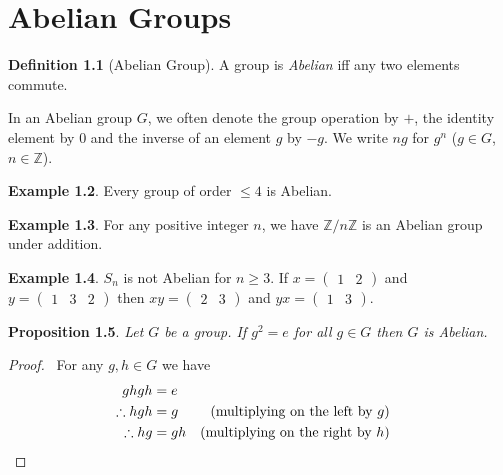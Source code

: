 \documentclass{book}
\let\qed\relax
\newtheorem{prop}{Proposition}[chapter]
\theoremstyle{definition}
\newtheorem{df}[prop]{Definition}
\newtheorem{ex}[prop]{Example}
\begin{document}
\chapter{Abelian Groups}

\begin{df}[Abelian Group]
    A group is \emph{Abelian} iff any two elements commute.
\end{df}

In an Abelian group $G$, we often denote the group operation by $+$, the identity element by $0$ and the inverse of an element $g$ by $-g$. We write $ng$ for $g^n$ ($g \in G$, $n \in \mathbb{Z}$).

\begin{ex}
    Every group of order $\leq 4$ is Abelian.
\end{ex}

\begin{ex}
    For any positive integer $n$, we have $\mathbb{Z} / n \mathbb{Z}$ is an Abelian group under addition.
\end{ex}

\begin{ex}
    $S_n$ is not Abelian for $n \geq 3$. If $x = \left( \begin{array}{cc} 1 & 2 \end{array} \right)$ and $y = \left( \begin{array}{ccc} 1 & 3 & 2 \end{array} \right)$ then $xy = \left( \begin{array}{cc} 2 & 3 \end{array} \right)$ and $yx = \left( \begin{array}{cc} 1 & 3 \end{array} \right)$.
\end{ex}

\begin{prop}
    Let $G$ be a group. If $g^2 = e$ for all $g \in G$ then $G$ is Abelian.
\end{prop}

\begin{proof}
    \pf\ For any $g,h \in G$ we have
    \begin{align*}
        ghgh & = e \\
        \therefore hgh & = g & (\text{multiplying on the left by }g) \\
        \therefore hg & = gh & (\text{multiplying on the right by } h) & \qed
    \end{align*}
\end{proof}
\end{document}
